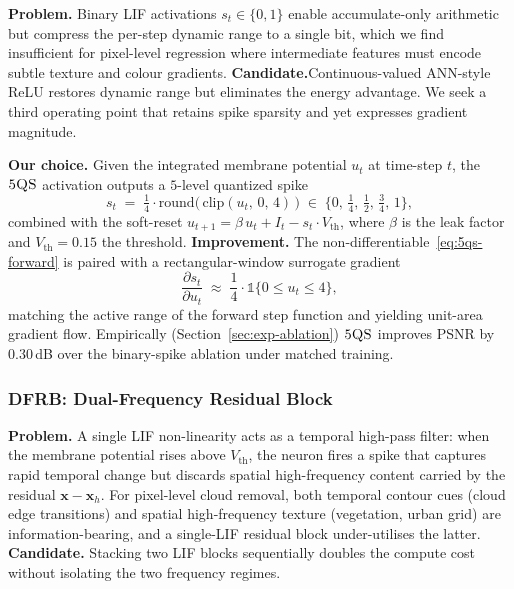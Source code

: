 \documentclass[conference]{IEEEtran}
\newcommand{\DFRB}{\textsc{DFRB}}
\newcommand{\FQS}{\textsc{5QS}}
\begin{document}
\textbf{Problem.}\;\;
Binary LIF activations $s_t\!\in\!\{0,1\}$ enable accumulate-only
arithmetic but compress the per-step dynamic range to a single bit,
which we find insufficient for pixel-level regression where
intermediate features must encode subtle texture and colour
gradients. \textbf{Candidate.}\;\;Continuous-valued ANN-style ReLU
restores dynamic range but eliminates the energy advantage. We
seek a third operating point that retains spike sparsity and yet
expresses gradient magnitude.

\textbf{Our choice.}\;\;
Given the integrated membrane potential $u_t$ at time-step $t$, the
$\FQS$ activation outputs a $5$-level quantized spike
\begin{equation}
s_t \;=\; \tfrac{1}{4}\!\cdot\!\mathrm{round}\!\big(\,\mathrm{clip}(u_t,\,0,\,4)\,\big)
\;\in\;\{0,\,\tfrac14,\,\tfrac12,\,\tfrac34,\,1\},
\label{eq:5qs-forward}
\end{equation}
combined with the soft-reset
$u_{t+1}\!=\!\beta\,u_t\!+\!I_t\!-\!s_t\!\cdot\!V_{\mathrm{th}}$,
where $\beta$ is the leak factor and $V_{\mathrm{th}}\!=\!0.15$ the
threshold. \textbf{Improvement.}\;\;
The non-differentiable~\eqref{eq:5qs-forward} is paired with a
rectangular-window surrogate gradient
\begin{equation}
\frac{\partial s_t}{\partial u_t}\;\approx\;
\frac{1}{4}\!\cdot\!\mathbb{1}\{0\le u_t\le 4\},
\label{eq:5qs-surrogate}
\end{equation}
matching the active range of the forward step function and yielding
unit-area gradient flow. Empirically (Section~\ref{sec:exp-ablation})
$\FQS$ improves PSNR by $0.30$\,dB over the binary-spike ablation
under matched training.


\subsubsection{\DFRB{}: Dual-Frequency Residual Block}\label{sec:framework-dfrb}

\textbf{Problem.}\;\;
A single LIF non-linearity acts as a temporal high-pass filter:
when the membrane potential rises above $V_{\mathrm{th}}$, the
neuron fires a spike that captures rapid temporal change but
discards spatial high-frequency content carried by the residual
$\mathbf{x}\!-\!\mathbf{x}_h$. For pixel-level cloud removal, both
temporal contour cues (cloud edge transitions) and spatial
high-frequency texture (vegetation, urban grid) are
information-bearing, and a single-LIF residual block under-utilises
the latter.
\textbf{Candidate.}\;\;
Stacking two LIF blocks sequentially doubles the compute cost
without isolating the two frequency regimes.
\end{document}
